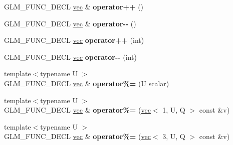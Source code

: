 \begin{DoxyCompactItemize}
\item 
\mbox{\label{structglm_1_1vec_3_013_00_01T_00_01Q_01_4_a5815270bfae62e24ed90c95b1054cd9d}} 
G\+L\+M\+\_\+\+F\+U\+N\+C\+\_\+\+D\+E\+CL \hyperlink{structglm_1_1vec}{vec} \& {\bfseries operator++} ()
\item 
\mbox{\label{structglm_1_1vec_3_013_00_01T_00_01Q_01_4_a7a914447d1121cc6aa1641280f397d95}} 
G\+L\+M\+\_\+\+F\+U\+N\+C\+\_\+\+D\+E\+CL \hyperlink{structglm_1_1vec}{vec} \& {\bfseries operator-\/-\/} ()
\item 
\mbox{\label{structglm_1_1vec_3_013_00_01T_00_01Q_01_4_acdb71d342fb424b32ea13d9ab2fd11b8}} 
G\+L\+M\+\_\+\+F\+U\+N\+C\+\_\+\+D\+E\+CL \hyperlink{structglm_1_1vec}{vec} {\bfseries operator++} (int)
\item 
\mbox{\label{structglm_1_1vec_3_013_00_01T_00_01Q_01_4_a1a93cbd62e3ce16b183ec1ba135e7c70}} 
G\+L\+M\+\_\+\+F\+U\+N\+C\+\_\+\+D\+E\+CL \hyperlink{structglm_1_1vec}{vec} {\bfseries operator-\/-\/} (int)
\item 
\mbox{\label{structglm_1_1vec_3_013_00_01T_00_01Q_01_4_a829ac327596dab68cb82ec753871dabb}} 
{\footnotesize template$<$typename U $>$ }\\G\+L\+M\+\_\+\+F\+U\+N\+C\+\_\+\+D\+E\+CL \hyperlink{structglm_1_1vec}{vec} \& {\bfseries operator\%=} (U scalar)
\item 
\mbox{\label{structglm_1_1vec_3_013_00_01T_00_01Q_01_4_a6be535e570c0bf961ffe15426bdca592}} 
{\footnotesize template$<$typename U $>$ }\\G\+L\+M\+\_\+\+F\+U\+N\+C\+\_\+\+D\+E\+CL \hyperlink{structglm_1_1vec}{vec} \& {\bfseries operator\%=} (\hyperlink{structglm_1_1vec}{vec}$<$ 1, U, Q $>$ const \&v)
\item 
\mbox{\label{structglm_1_1vec_3_013_00_01T_00_01Q_01_4_a60aee54fdff3fb07eb2a58f95c9690c5}} 
{\footnotesize template$<$typename U $>$ }\\G\+L\+M\+\_\+\+F\+U\+N\+C\+\_\+\+D\+E\+CL \hyperlink{structglm_1_1vec}{vec} \& {\bfseries operator\%=} (\hyperlink{structglm_1_1vec}{vec}$<$ 3, U, Q $>$ const \&v)

\end{DoxyCompactItemize}
